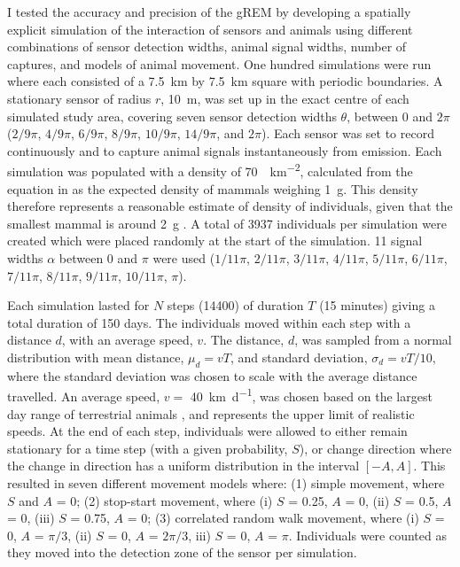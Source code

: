 I tested the accuracy and precision of the gREM by developing a spatially explicit simulation of the interaction of sensors and animals using different combinations of sensor detection widths, animal signal widths, number of captures, and models of animal movement.
One hundred simulations were run where each consisted of a  \SI{7.5}{\kilo\meter} by \SI{7.5}{\kilo\meter} square with periodic boundaries.
A stationary sensor of radius $r$, \SI{10}{\meter}, was set up in the exact centre of each simulated study area, covering seven sensor detection widths $\theta$, between 0 and $2\pi$ ($2/9\pi$, $4/9\pi$, $6/9\pi$, $8/9\pi$, $10/9\pi$, $14/9\pi$, and $2\pi$).
Each sensor was set to record continuously and to capture animal signals instantaneously from emission.
Each simulation was populated with a density of \SI{70}{\animals\per\kilo\meter\squared}, calculated from the equation in \cite{damuth1981population} as the expected density of mammals weighing \SI{1}{\gram}.
This density therefore represents a reasonable estimate of density of individuals, given that the smallest mammal is around \SI{2}{\gram} \cite{jones2009pantheria}.
A total of 3937 individuals per simulation were created which were placed randomly at the start of the simulation. 11 signal widths $\alpha$ between 0 and $\pi$ were used ($1/11\pi$, $2/11\pi$, $3/11\pi$, $4/11\pi$, $5/11\pi$, $6/11\pi$, $7/11\pi$, $8/11\pi$, $9/11\pi$, $10/11\pi$, $\pi$). 

Each simulation lasted for $N$ steps (14400) of duration $T$ (15 minutes) giving a total duration of 150 days.
The individuals moved within each step with a distance $d$, with an average speed, $v$.
The distance, $d$, was sampled from a normal distribution with mean distance, $\mu_d = vT$, and standard deviation, $\sigma_d = vT/10$, where the standard deviation was chosen to scale with the average distance travelled.
An average speed, $v = $ \SI{40}{\kilo\meter \per \day}, was chosen based on the largest day range of terrestrial animals \cite{carbone2005far}, and represents the upper limit of realistic speeds.
At the end of each step, individuals were allowed to either remain stationary for a time step (with a given probability, $S$), or change direction where the change in direction has a uniform distribution in the interval $\left[-A, A\right]$.
This resulted in seven different movement models where: (1) simple movement, where $S$ and $A$ = 0; (2) stop-start movement, where (i) $S$ = 0.25, $A$ = 0, (ii) $S$ = 0.5, $A$ = 0, (iii) $S$ = 0.75, $A$ = 0; (3) correlated random walk movement, where (i) $S$ = 0, $A$ = $\pi/3$, (ii) $S$ = 0, $A$ = $2\pi/3$, iii) $S$ = 0, $A$ = $\pi$.
Individuals were counted as they moved into the detection zone of the sensor per simulation. 

